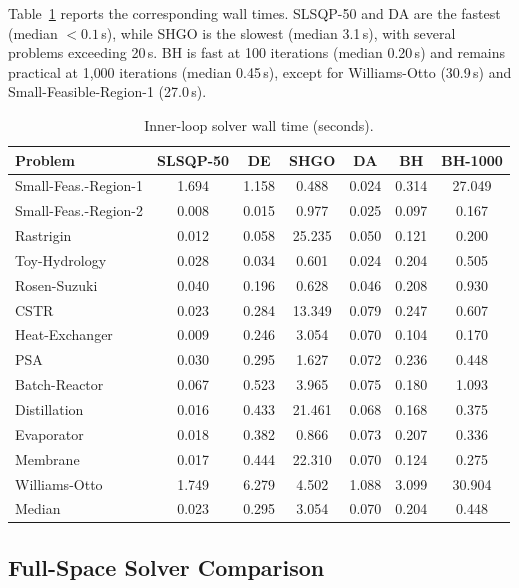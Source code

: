 \documentclass[12pt,a4paper]{article}%
\theoremstyle{plain}%
\theoremstyle{remark}%
\theoremstyle{definition}%
\begin{document}
\begin{appendices}
Table~\ref{tab:inner_time} reports the corresponding wall times. SLSQP-50 and DA are the fastest (median $<0.1$\,s), while SHGO is the slowest (median 3.1\,s), with several problems exceeding 20\,s. BH is fast at 100 iterations (median 0.20\,s) and remains practical at 1{,}000 iterations (median 0.45\,s), except for Williams-Otto (30.9\,s) and Small-Feasible-Region-1 (27.0\,s).

\begin{table}[htbp]
\centering
\caption{Inner-loop solver wall time (seconds).}
\label{tab:inner_time}
\footnotesize
\begin{tabular}{@{}lcccccc@{}}
\toprule
\textbf{Problem} & \textbf{SLSQP-50} & \textbf{DE} & \textbf{SHGO} & \textbf{DA} & \textbf{BH} & \textbf{BH-1000} \\
\midrule
Small-Feas.-Region-1 & 1.694 & 1.158 & 0.488 & 0.024 & 0.314 & 27.049 \\
Small-Feas.-Region-2 & 0.008 & 0.015 & 0.977 & 0.025 & 0.097 & 0.167 \\
Rastrigin & 0.012 & 0.058 & 25.235 & 0.050 & 0.121 & 0.200 \\
Toy-Hydrology & 0.028 & 0.034 & 0.601 & 0.024 & 0.204 & 0.505 \\
Rosen-Suzuki & 0.040 & 0.196 & 0.628 & 0.046 & 0.208 & 0.930 \\
CSTR & 0.023 & 0.284 & 13.349 & 0.079 & 0.247 & 0.607 \\
Heat-Exchanger & 0.009 & 0.246 & 3.054 & 0.070 & 0.104 & 0.170 \\
PSA & 0.030 & 0.295 & 1.627 & 0.072 & 0.236 & 0.448 \\
Batch-Reactor & 0.067 & 0.523 & 3.965 & 0.075 & 0.180 & 1.093 \\
Distillation & 0.016 & 0.433 & 21.461 & 0.068 & 0.168 & 0.375 \\
Evaporator & 0.018 & 0.382 & 0.866 & 0.073 & 0.207 & 0.336 \\
Membrane & 0.017 & 0.444 & 22.310 & 0.070 & 0.124 & 0.275 \\
Williams-Otto & 1.749 & 6.279 & 4.502 & 1.088 & 3.099 & 30.904 \\
\midrule
Median & 0.023 & 0.295 & 3.054 & 0.070 & 0.204 & 0.448 \\
\bottomrule
\end{tabular}
\end{table}

\subsection{Full-Space Solver Comparison}\label{subsec:full_solver}


\end{appendices}
\end{document}
